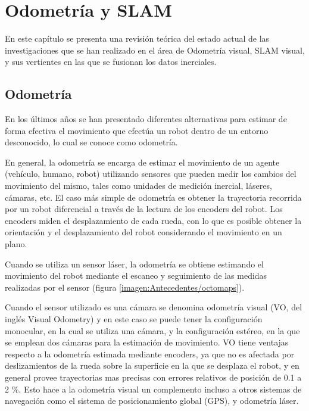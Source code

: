 \chapter{Odometría y SLAM}
\label{capitulo2}

En este capítulo se presenta una revisión teórica del estado actual de las investigaciones que se han realizado en el área de Odometría visual, SLAM visual, y sus vertientes en las que se fusionan los datos inerciales.

\section{Odometría}

En los últimos años se han presentado diferentes alternativas para estimar de forma efectiva el movimiento que efectúa un robot dentro de un entorno desconocido, lo cual se conoce como odometría.

En general, la odometría se encarga de estimar el movimiento de un agente (vehículo, humano, robot) utilizando sensores que pueden medir los cambios del movimiento del mismo, tales como unidades de medición inercial, láseres, cámaras, etc. El caso más simple de odometría es obtener la trayectoria recorrida por un robot diferencial a través de la lectura de los encoders del robot. Los encoders miden el desplazamiento de cada rueda, con lo que es posible obtener la orientación y el desplazamiento del robot considerando el movimiento en un plano.

Cuando se utiliza un sensor láser, la odometría se obtiene estimando el movimiento del robot mediante el escaneo y seguimiento de las medidas realizadas por el sensor (figura \ref{imagen:Antecedentes/octomaps}).

Cuando el sensor utilizado es una cámara se denomina odometría visual (VO, del inglés Visual Odometry) y en este caso se puede tener la configuración monocular, en la cual se utiliza una cámara, y la configuración estéreo, en la que se emplean dos cámaras para la estimación de movimiento. VO tiene ventajas respecto a la odometría estimada mediante encoders, ya que no es afectada por deslizamientos de la rueda sobre la superficie en la que se desplaza el robot, y en general provee trayectorias mas precisas con errores relativos de posición de 0.1 a 2 \%. Esto hace a la odometría visual un complemento incluso a otros sistemas de navegación como el sistema de posicionamiento global (GPS), y odometría láser.

